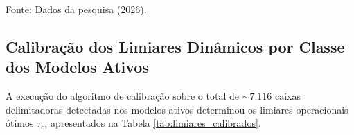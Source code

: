 \documentclass[a4paper,11pt]{article}
\begin{document}
\begin{table}[htbp]
\caption{Métricas de desempenho e telemetria operacional dos modelos ativos da API de predição em produção real.}
\vspace{.05cm}
\centering
{}
\vspace{0.05cm}
{\footnotesize Fonte: Dados da pesquisa (2026).}
\label{tab:metricas_processo}
\end{table}

\subsection*{Calibração dos Limiares Dinâmicos por Classe dos Modelos Ativos}
A execução do algoritmo de calibração sobre o total de $\sim 7.116$ caixas delimitadoras detectadas nos modelos ativos determinou os limiares operacionais ótimos $\tau_c$, apresentados na Tabela \ref{tab:limiares_calibrados}.
\end{document}
